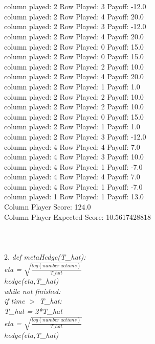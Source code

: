 \documentclass[11pt, oneside]{article}   	%
\begin{document}
\\
\\
column played: 2   Row Played: 3 Payoff: -12.0\\
column played: 2   Row Played: 4 Payoff: 20.0\\
column played: 2   Row Played: 3 Payoff: -12.0\\
column played: 2   Row Played: 4 Payoff: 20.0\\
column played: 2   Row Played: 0 Payoff: 15.0\\
column played: 2   Row Played: 0 Payoff: 15.0\\
column played: 2   Row Played: 2 Payoff: 10.0\\
column played: 2   Row Played: 4 Payoff: 20.0\\
column played: 2   Row Played: 1 Payoff: 1.0\\
column played: 2   Row Played: 2 Payoff: 10.0\\
column played: 2   Row Played: 2 Payoff: 10.0\\
column played: 2   Row Played: 0 Payoff: 15.0\\
column played: 2   Row Played: 1 Payoff: 1.0\\
column played: 2   Row Played: 3 Payoff: -12.0\\
column played: 4   Row Played: 4 Payoff: 7.0\\
column played: 4   Row Played: 3 Payoff: 10.0\\
column played: 4   Row Played: 1 Payoff: -7.0\\
column played: 4   Row Played: 4 Payoff: 7.0\\
column played: 4   Row Played: 1 Payoff: -7.0\\
column played: 1   Row Played: 1 Payoff: 13.0\\
Column Player Score: 124.0\\
Column Player Expected Score: 10.5617428818\\
\\\\\\
2.  \textit{def metaHedge(T\_hat):\\
\indent\indent eta = $\sqrt{\frac{log(number\ actions)}{T\_hat}}$\\
\indent\indent hedge(eta,T\_hat)\\
\indent\indent while not finished:\\
\indent\indent\indent if time $>$ T\_hat:\\
\indent\indent\indent\indent T\_hat = 2*T\_hat\\
\indent\indent\indent\indent eta = $\sqrt{\frac{log(number\ actions)}{T\_hat}}$\\
\indent\indent\indent\indent hedge(eta,T\_hat)\\\\
}
\end{document}
